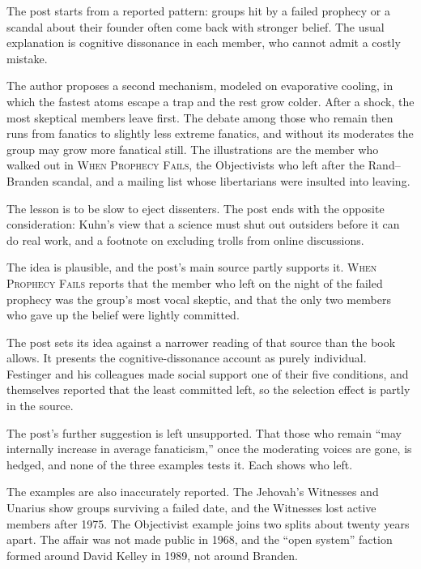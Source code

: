 \begin{afterword}
\summaryhead

The post starts from a reported pattern: groups hit by a failed prophecy or a scandal about their founder often come back with stronger belief. The usual explanation is cognitive dissonance in each member, who cannot admit a costly mistake.

The author proposes a second mechanism, modeled on evaporative cooling, in which the fastest atoms escape a trap and the rest grow colder. After a shock, the most skeptical members leave first. The debate among those who remain then runs from fanatics to slightly less extreme fanatics, and without its moderates the group may grow more fanatical still. The illustrations are the member who walked out in \textsc{When Prophecy Fails}, the Objectivists who left after the Rand--Branden scandal, and a mailing list whose libertarians were insulted into leaving.

The lesson is to be slow to eject dissenters. The post ends with the opposite consideration: Kuhn's view that a science must shut out outsiders before it can do real work, and a footnote on excluding trolls from online discussions.

\responsehead

The idea is plausible, and the post's main source partly supports it. \textsc{When Prophecy Fails} reports that the member who left on the night of the failed prophecy was the group's most vocal skeptic, and that the only two members who gave up the belief were lightly committed.

The post sets its idea against a narrower reading of that source than the book allows. It presents the cognitive-dissonance account as purely individual. Festinger and his colleagues made social support one of their five conditions, and themselves reported that the least committed left, so the selection effect is partly in the source.

The post's further suggestion is left unsupported. That those who remain ``may internally increase in average fanaticism,'' once the moderating voices are gone, is hedged, and none of the three examples tests it. Each shows who left.

The examples are also inaccurately reported. The Jehovah's Witnesses and Unarius show groups surviving a failed date, and the Witnesses lost active members after 1975. The Objectivist example joins two splits about twenty years apart. The affair was not made public in 1968, and the ``open system'' faction formed around David Kelley in 1989, not around Branden.


\end{afterword}
